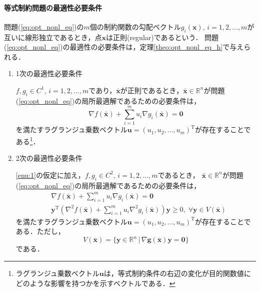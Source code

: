 \documentclass{jsreport}
\begin{document}
\paragraph{等式制約問題の最適性必要条件}
問題(\ref{eq:opt_nonl_eq})の$m$個の制約関数の勾配ベクトル$g_i(\bm{x}), \, i = 1, 2, \ldots, m$が互いに線形独立であるとき，点$\bm{x}$は正則(regular)であるという．
問題(\ref{eq:opt_nonl_eq})の最適性の必要条件は，定理\ref{theo:opt_nonl_eq_h}で与えられる．
\begin{theo}\label{theo:opt_nonl_eq_h}
  \begin{enumerate}
    \item 1次の最適性必要条件\label{enu:1}

    $f, g_i \in C^1, \, i = 1, 2, \ldots, m$であり，$\bar{\bm{x}}$が正則であるとき，$\bar{\bm{x}} \in \mathbb{R}^n$が問題(\ref{eq:opt_nonl_eq})の局所最適解であるための必要条件は，
    \begin{equation}\label{eq:opt_nonl_eq_h_1}
      \nabla f(\bar{\bm{x}}) + \sum_{i = 1}^m u_i \nabla g_i(\bar{\bm{x}}) = \bm{0}
    \end{equation}
    を満たすラグランジュ乗数ベクトル$\bm{u} = (u_1, u_2, \ldots, u_m)^{\mathrm{T}}$が存在することである\footnote{ラグランジュ乗数ベクトル$\bm{u}$は，等式制約条件の右辺の変化が目的関数値にどのような影響を持つかを示すベクトルである．}．

    \item 2次の最適性必要条件

    \ref{enu:1}の仮定に加え，$f, g_i \in C^2, \, i = 1, 2, \ldots, m$であるとき，
    $\bar{\bm{x}} \in \mathbb{R}^n$が問題(\ref{eq:opt_nonl_eq})の局所最適解であるための必要条件は，
    \begin{align}\label{eq:opt_nonl_eq_h_2}
      &\nabla f(\bar{\bm{x}}) + \sum_{i = 1}^m u_i \nabla g_i(\bar{\bm{x}}) = \bm{0} \nonumber \\
      &\bm{y}^{\mathrm{T}} \left({\nabla}^2 f(\bar{\bm{x}}) + \sum_{i = 1}^m u_i {\nabla}^2 g_i(\bar{\bm{x}})\right) \bm{y} \geq 0, \; \forall \bm{y} \in V(\bar{\bm{x}})
    \end{align}
    を満たすラグランジュ乗数ベクトル$\bm{u} = (u_1, u_2, \ldots, u_m)^{\mathrm{T}}$が存在することである．ただし，
    \begin{equation}\label{eq:v}
      V(\bar{\bm{x}}) = \{\bm{y} \in \mathbb{R}^n \, | \, \nabla \bm{g}(\bar{\bm{x}}) \bm{y} = \bm{0}\}
    \end{equation}
    である．
  \end{enumerate}
\end{theo}
\end{document}
